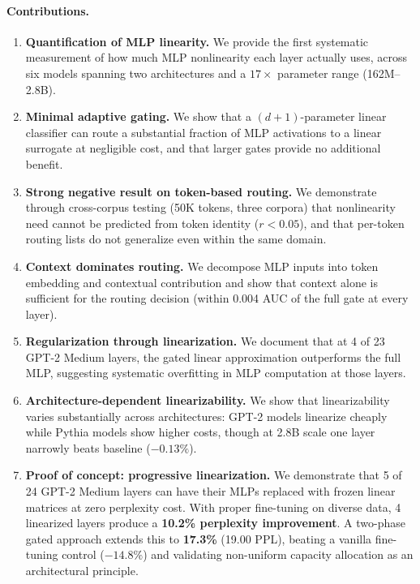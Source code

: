 \documentclass[11pt]{article}
\begin{document}
\paragraph{Contributions.}
\begin{enumerate}
    \item \textbf{Quantification of MLP linearity.} We provide the first systematic measurement of how much MLP nonlinearity each layer actually uses, across six models spanning two architectures and a $17\times$ parameter range (162M--2.8B).
    \item \textbf{Minimal adaptive gating.} We show that a $(d{+}1)$-parameter linear classifier can route a substantial fraction of MLP activations to a linear surrogate at negligible cost, and that larger gates provide no additional benefit.
    \item \textbf{Strong negative result on token-based routing.} We demonstrate through cross-corpus testing (50K tokens, three corpora) that nonlinearity need cannot be predicted from token identity ($r < 0.05$), and that per-token routing lists do not generalize even within the same domain.
    \item \textbf{Context dominates routing.} We decompose MLP inputs into token embedding and contextual contribution and show that context alone is sufficient for the routing decision (within 0.004 AUC of the full gate at every layer).
    \item \textbf{Regularization through linearization.} We document that at 4 of 23 GPT-2 Medium layers, the gated linear approximation outperforms the full MLP, suggesting systematic overfitting in MLP computation at those layers.
    \item \textbf{Architecture-dependent linearizability.} We show that linearizability varies substantially across architectures: GPT-2 models linearize cheaply while Pythia models show higher costs, though at 2.8B scale one layer narrowly beats baseline ($-0.13\%$).
    \item \textbf{Proof of concept: progressive linearization.} We demonstrate that 5 of 24 GPT-2 Medium layers can have their MLPs replaced with frozen linear matrices at zero perplexity cost. With proper fine-tuning on diverse data, 4 linearized layers produce a \textbf{10.2\% perplexity improvement}. A two-phase gated approach extends this to \textbf{17.3\%} (19.00 PPL), beating a vanilla fine-tuning control ($-14.8\%$) and validating non-uniform capacity allocation as an architectural principle.
\end{enumerate}
\end{document}
